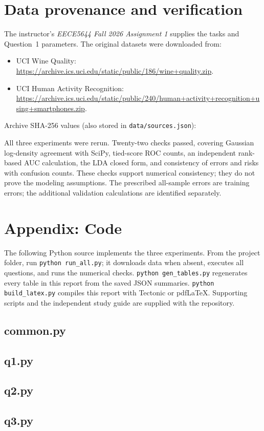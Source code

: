 \documentclass[10pt]{article}
\begin{document}
\section*{Data provenance and verification}
The instructor's \emph{EECE5644 Fall 2026 Assignment 1} supplies the tasks and Question~1 parameters. The original datasets were downloaded from:
\begin{itemize}
\item UCI Wine Quality: \url{https://archive.ics.uci.edu/static/public/186/wine+quality.zip}.
\item UCI Human Activity Recognition: \url{https://archive.ics.uci.edu/static/public/240/human+activity+recognition+using+smartphones.zip}.
\end{itemize}
Archive SHA-256 values (also stored in \texttt{data/sources.json}):
\begin{quote}\footnotesize\ttfamily

\end{quote}
All three experiments were rerun. Twenty-two checks passed, covering Gaussian log-density agreement with SciPy, tied-score ROC counts, an independent rank-based AUC calculation, the LDA closed form, and consistency of errors and risks with confusion counts. These checks support numerical consistency; they do not prove the modeling assumptions. The prescribed all-sample errors are training errors; the additional validation calculations are identified separately.

\clearpage
\appendix
\section*{Appendix: Code}
The following Python source implements the three experiments. From the project folder, run \texttt{python run\_all.py}; it downloads data when absent, executes all questions, and runs the numerical checks. \texttt{python gen\_tables.py} regenerates every table in this report from the saved JSON summaries. \texttt{python build\_latex.py} compiles this report with Tectonic or pdfLaTeX. Supporting scripts and the independent study guide are supplied with the repository.
\subsection*{common.py}
\subsection*{q1.py}
\subsection*{q2.py}
\subsection*{q3.py}
\end{document}

